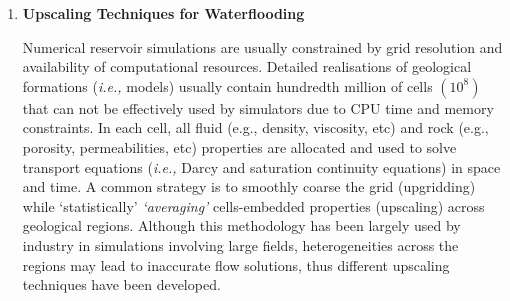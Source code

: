\documentclass[12pts,a4paper,amsmath,amssymb,floatfix]{article}%
\newcommand{\all}{MSc O$\&$GE, PetE, UG Chem/Mech/Pet Engineering}
\newcommand{\ie}{{\it i.e., }}
\newcommand{\etall}{{\it et al. }}
\begin{document}
\begin{enumerate}[label=\bfseries Project: \arabic*:]
\noindent
{\bf Specifics:} 
\begin{enumerate}
\item \all -- 1 student;
\item Computational/Theoretical/Review;
\item After initial review of the whole workflow (Weeks 1-3), the student {\bf must} choose one/two stage(s) and undertake an in-depth analysis and simulation (in either programming language, \ie Matlab, Python, C or Fortran, or an appropriate simulation tool) on this/these stage(s);
\end{enumerate}

\noindent
{\bf References:}
\begin{itemize}
\item Chen (2007) `Reservoir Simulation – Mathematical Techniques in Oil Recovery’, SIAM;
\item Ahmed $\&$ McKinney (2005) `Advanced Reservoir Engineering’, Elsevier;
\item Jenny \etall (2002) `Modeling Flow in Geometrically Complex Reservoirs Using Hexahedral Multiblock Grids’, SPE 78673;
\item DeBaun \etall (2006) `An Extensible Architecture for Next Generation Scalable Parallel Reservoir Simulation’, SPE 93274;
\item Chen \etall (2006) `Computational Methods for Multiphase Flows in PorousMedia', SIAM Computational Science $\&$ Engineering, ISBN 0-89871-606-3;
\item Teletzke \etall (2010) `Enhanced Oil Recovery Pilot Testing Best Practices', SPE Journal SPE118055;
\item Miller \etall (1998) `Multiphase Flow andTransport Modeling in Heterogeneous Porous Media: Challenges and Approaches', Advances in Water Resources 21:77-120.
\end{itemize}

\clearpage

\item {\bf Upscaling Techniques for Waterflooding}

  Numerical reservoir simulations are usually constrained by grid resolution and availability of computational resources. Detailed realisations of geological formations (\ie models) usually contain hundredth million of cells $\left(\text{10}^{8}\right)$ that can not be effectively used by simulators due to CPU time and memory constraints.  In each cell, all fluid (e.g., density, viscosity, etc) and rock (e.g., porosity, permeabilities, etc) properties are allocated and used to solve transport equations (\ie Darcy and saturation continuity equations) in space and time. A common strategy is to smoothly coarse the grid (upgridding) while `statistically' {\it `averaging'} cells-embedded properties (upscaling) across geological regions.  Although this methodology has been largely used by industry in simulations involving large fields, heterogeneities across the regions may lead to inaccurate flow solutions, thus different upscaling techniques have been developed. 



\end{enumerate}
\end{document}
